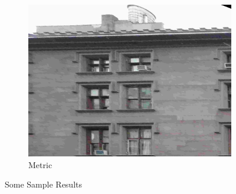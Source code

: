 \documentclass[paper=a4, fontsize=11pt]{scrartcl} %
\begin{document}
\begin{figure}
\begin{subfigure}[ht]{0.3\textwidth}
        \includegraphics[width=\textwidth]{figures/img3_met.jpg}
        \caption{Metric\label{fig:img3_met}}
    \end{subfigure}
    \caption{Some Sample Results\label{fig:res2}}
\end{figure}
\end{document}
